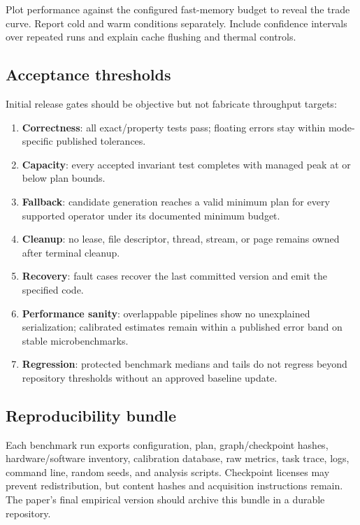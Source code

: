 Plot performance against the configured fast-memory budget to reveal the trade curve. Report cold and warm conditions separately. Include confidence intervals over repeated runs and explain cache flushing and thermal controls.

\subsection{Acceptance thresholds}

Initial release gates should be objective but not fabricate throughput targets:

\begin{enumerate}
  \item \textbf{Correctness}: all exact/property tests pass; floating errors stay within mode-specific published tolerances.
  \item \textbf{Capacity}: every accepted invariant test completes with managed peak at or below plan bounds.
  \item \textbf{Fallback}: candidate generation reaches a valid minimum plan for every supported operator under its documented minimum budget.
  \item \textbf{Cleanup}: no lease, file descriptor, thread, stream, or page remains owned after terminal cleanup.
  \item \textbf{Recovery}: fault cases recover the last committed version and emit the specified code.
  \item \textbf{Performance sanity}: overlappable pipelines show no unexplained serialization; calibrated estimates remain within a published error band on stable microbenchmarks.
  \item \textbf{Regression}: protected benchmark medians and tails do not regress beyond repository thresholds without an approved baseline update.
\end{enumerate}

\subsection{Reproducibility bundle}

Each benchmark run exports configuration, plan, graph/checkpoint hashes, hardware/software inventory, calibration database, raw metrics, task trace, logs, command line, random seeds, and analysis scripts. Checkpoint licenses may prevent redistribution, but content hashes and acquisition instructions remain. The paper's final empirical version should archive this bundle in a durable repository.
